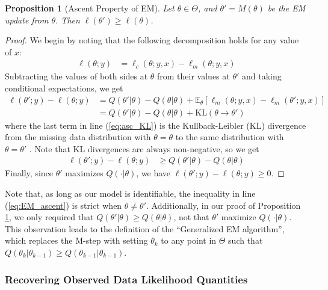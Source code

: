 \documentclass[11pt, oneside]{article}   	%
\newcommand{\bE}{\mathbb{E}}
\newtheorem{proposition}{Proposition}[section]
\begin{document}
\begin{proposition}[Ascent Property of EM]
    \label{thm2:EM_ascent}
    Let $\theta \in \Theta$, and $\theta' = M(\theta)$ be the EM update from $\theta$. Then $\ell(\theta') \geq \ell(\theta)$.
\end{proposition}

\begin{proof}
    We begin by noting that the following decomposition holds for any value of $x$:
    \begin{align}
        \ell(\theta; y) &= \ell_c(\theta; y, x) - \ell_m(\theta; y, x)
    \end{align}
    Subtracting the values of both sides at $\theta$ from their values at $\theta'$ and taking conditional expectations, we get
    \begin{align}
        \ell(\theta'; y) - \ell(\theta; y) &= Q(\theta'|\theta) - Q(\theta|\theta) + \bE_{\theta}[\ell_m(\theta; y, x) - \ell_m(\theta'; y, x)]\\
        &= Q(\theta'|\theta) - Q(\theta|\theta) + \mathrm{KL}(\theta \rightarrow \theta') \label{eq:asc_KL}
    \end{align}
    where the last term in line (\ref{eq:asc_KL}) is the Kullback-Leibler (KL) divergence from the missing data distribution with $\theta = \theta$ to the same distribution with $\theta = \theta'$ \citep{van98}. Note that KL divergences are always non-negative, so we get
    \begin{align}
    \ell(\theta'; y) - \ell(\theta; y) &\geq Q(\theta'|\theta) - Q(\theta|\theta)  \label{eq:EM_ascent}  
    \end{align}
    Finally, since $\theta'$ maximizes $Q(\cdot|\theta)$, we have $\ell(\theta'; y) - \ell(\theta; y) \geq 0$.
\end{proof}

Note that, as long as our model is identifiable, the inequality in line (\ref{eq:EM_ascent}) is strict when $\theta \neq \theta'$. Additionally, in our proof of Proposition \ref{thm2:EM_ascent}, we only required that $Q(\theta'|\theta) \geq Q(\theta|\theta)$, not that $\theta'$ maximize $Q(\cdot|\theta)$. This observation leads to the definition of the ``Generalized EM algorithm'', which replaces the M-step with setting $\theta_k$ to any point in $\Theta$ such that $Q(\theta_k|\theta_{k-1}) \geq Q(\theta_{k-1}|\theta_{k-1})$.



\subsubsection{Recovering Observed Data Likelihood Quantities}
\end{document}
